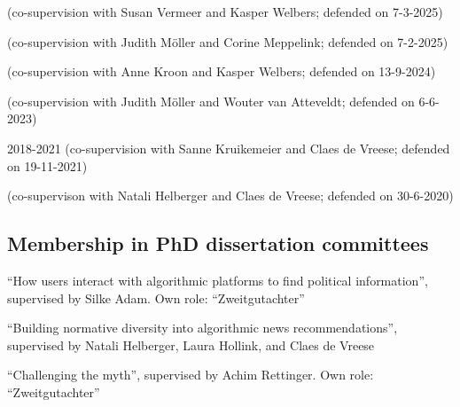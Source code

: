 \documentclass[11pt,a4paper,sans]{moderncv}
\begin{document}
(co-supervision with Susan Vermeer and Kasper Welbers; defended on 7-3-2025) \newline

(co-supervision with Judith M\"oller and Corine Meppelink; defended on 7-2-2025) \newline

(co-supervision with Anne Kroon and Kasper Welbers; defended on 13-9-2024) \newline

(co-supervision with Judith M\"oller and Wouter van Atteveldt; defended on 6-6-2023) \newline

 {2018-2021}
(co-supervision with Sanne Kruikemeier and Claes de Vreese; defended on 19-11-2021) \newline

(co-supervison with Natali Helberger and Claes de Vreese; defended on 30-6-2020) \newline



\subsection{Membership in PhD dissertation committees}

``How users interact with algorithmic platforms to find political information'', supervised by Silke Adam. Own role: ``Zweitgutachter''  \newline


``Building normative diversity into algorithmic news recommendations'', supervised by Natali Helberger, Laura Hollink, and Claes de Vreese \newline

``Challenging the myth'', supervised by Achim Rettinger. Own role: ``Zweitgutachter''  \newline
\end{document}
